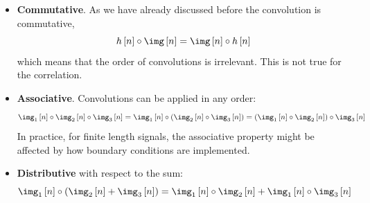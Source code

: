 \begin{itemize}
	\item {\bf Commutative}. As we have already discussed before the convolution is commutative,
	      \begin{equation}
		      h\left[n\right] \circ \img \left[n\right] = \img \left[n\right] \circ h\left[n\right]
	      \end{equation}
	      which means that the order of convolutions is irrelevant. This is not true for the correlation.

	\item {\bf Associative}. Convolutions can be applied in any order:
	      \begin{equation}
		      \img_1 \left[n\right] \circ \img_2 \left[n\right] \circ \img_3 \left[n\right] = \img_1\left[n\right] \circ (\img_2\left[n\right] \circ \img_3\left[n\right]) = (\img_1\left[n\right] \circ \img_2\left[n\right]) \circ \img_3\left[n\right] \label{eqn:linear_image_filtering:conv_associative_property}
	      \end{equation}
	      In practice, for finite length signals, the associative property might be affected by how boundary conditions are implemented.

	\item {\bf Distributive} with respect to the sum:
	      \begin{equation}
		      \img_1\left[n\right] \circ (\img_2\left[n\right] + \img_3\left[n\right] ) = \img_1\left[n\right] \circ \img_2\left[n\right] +  \img_1 \left[n\right] \circ \img_3 \left[n\right]
	      \end{equation}



\end{itemize}
